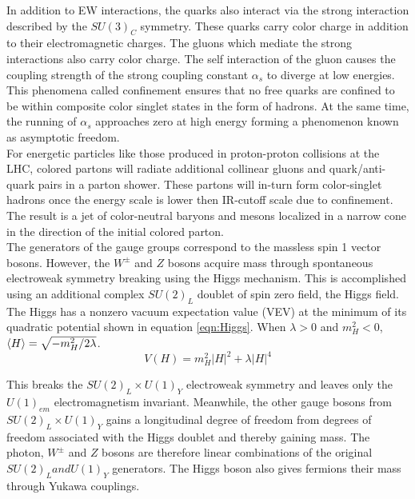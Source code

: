 \indent In addition to EW interactions,  the quarks also interact via the strong interaction described by the $SU(3)_C$ symmetry.  These quarks carry color charge in addition to their electromagnetic charges.  The gluons which mediate the strong interactions also carry color charge.  The self interaction of the gluon causes the coupling strength of the strong coupling constant $\alpha_s$ to diverge at low energies.  This phenomena called confinement ensures that no free quarks are confined to be within composite color singlet states in the form of hadrons.  At the same time, the running of $\alpha_s$ approaches zero at high energy forming a phenomenon known as asymptotic freedom. \\

\indent For energetic particles like those produced in proton-proton collisions at the LHC, colored partons will radiate additional collinear gluons and quark/anti-quark pairs in a parton shower. These partons will in-turn form color-singlet hadrons once the energy scale is lower then IR-cutoff scale due to confinement.  The result is a jet of color-neutral baryons and mesons localized in a narrow cone in the direction of the initial colored parton. \\

\indent The generators of the gauge groups correspond to the massless spin 1 vector bosons.  However, the $W^\pm$ and $Z$ bosons acquire mass through spontaneous electroweak symmetry breaking using the Higgs mechanism.  This is accomplished using an additional complex $SU(2)_L$ doublet of spin zero field, the Higgs field.  The Higgs has a nonzero vacuum expectation value (VEV) at the minimum of its quadratic potential shown in equation \ref{eqn:Higgs}.  When $\lambda > 0$ and $m_H^2 < 0 $, $\braket{H} = \sqrt{-m_H^2/2\lambda}$.  \\

\begin{equation}
\label{eqn:Higgs}
V(H) = m_H^2 |H|^2 +\lambda |H|^4
\end{equation}

\indent This breaks the $SU(2)_L \times U(1)_Y$ electroweak symmetry and leaves only the $U(1)_{em}$ electromagnetism invariant.  Meanwhile, the other gauge bosons from $SU(2)_L \times U(1)_Y$ gains a longitudinal degree of freedom from degrees of freedom associated with the Higgs doublet and thereby gaining mass.  The photon, $W^\pm$ and $Z$ bosons are therefore linear combinations of the original $SU(2)_L and U(1)_Y$ generators.  The Higgs boson also gives fermions their mass through Yukawa couplings. \\

